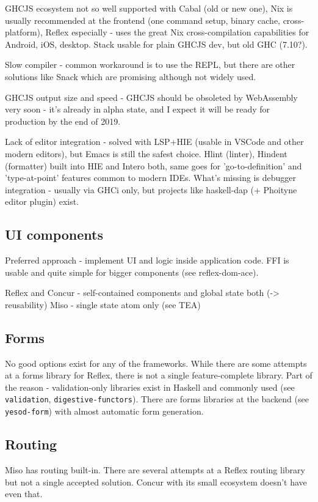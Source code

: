 \documentclass[english,odsaz]{fitthesis}
\begin{document}
GHCJS ecosystem not so well supported with Cabal (old or new one), Nix is
usually recommended at the frontend (one command setup, binary cache,
cross-platform), Reflex especially - uses the great Nix cross-compilation
capabilities for Android, iOS, desktop. Stack usable for plain GHCJS dev, but
old GHC (7.10?).

Slow compiler - common workaround is to use the REPL, but there are other
solutions like Snack which are promising although not widely used.

GHCJS output size and speed - GHCJS should be obsoleted by WebAssembly very
soon - it's already in alpha state, and I expect it will be ready for
production by the end of 2019.

Lack of editor integration - solved with LSP+HIE (usable in VSCode and other modern
editors), but Emacs is still the safest choice. Hlint (linter), Hindent
(formatter) built into HIE and Intero both, same goes for 'go-to-definition' and
'type-at-point' features common to modern IDEs. What's missing is debugger
integration - usually via GHCi only, but projects like haskell-dap (+ Phoityne
editor plugin) exist.

\subsection{UI components}
\label{sec:orge5f0ab9}
Preferred approach - implement UI and logic inside application code. FFI is
usable and quite simple for bigger components (see reflex-dom-ace).

Reflex and Concur - self-contained components and global state both (-> reusability)
Miso - single state atom only (see TEA)

\subsection{Forms}
\label{sec:org8d8e902}
No good options exist for any of the frameworks. While there are some attempts
at a forms library for Reflex, there is not a single feature-complete
library. Part of the reason - validation-only libraries exist in Haskell and
commonly used (see \texttt{validation}, \texttt{digestive-functors}). There are forms libraries at
the backend (see \texttt{yesod-form}) with almost automatic form generation.

\subsection{Routing}
\label{sec:org8dc81d7}
Miso has routing built-in. There are several attempts at a Reflex routing
library but not a single accepted solution. Concur with its small ecosystem
doesn't have even that.
\end{document}
